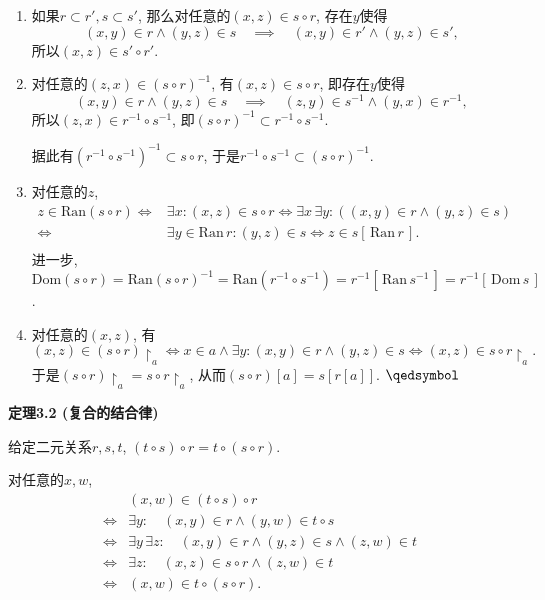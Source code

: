 \documentclass[UTF8]{ctexart}
\begin{document}
\begin{enumerate}
    \item 如果$r\subset r',s\subset s'$, 那么对任意的$(x,z)\in s\circ r$,
    存在$y$使得
    \[
        (x,y)\in r\land(y,z)\in s\quad\implies\quad
        (x,y)\in r'\land(y,z)\in s',
    \]
    所以$(x,z)\in s'\circ r'$.

    \item 对任意的$(z,x)\in(s\circ r)^{-1}$, 有$(x,z)\in s\circ r$,
    即存在$y$使得
    \[
        (x,y)\in r\land(y,z)\in s\quad\implies\quad
        (z,y)\in s^{-1}\land(y,x)\in r^{-1},
    \]
    所以$(z,x)\in r^{-1}\circ s^{-1}$,
    即$(s\circ r)^{-1}\subset r^{-1}\circ s^{-1}$.

    \hspace{2.17em}
    据此有$(r^{-1}\circ s^{-1})^{-1}\subset s\circ r$,
    于是$r^{-1}\circ s^{-1}\subset(s\circ r)^{-1}$.

    \item 对任意的$z$,
    \[\begin{aligned}
        z\in\mathrm{Ran}(s\circ r)\iff&\exists x:(x,z)\in s\circ r\iff
        \exists x\,\exists y:((x,y)\in r\land(y,z)\in s)\\[-3pt]
        \iff&\exists y\in\mathrm{Ran}\,r:(y,z)\in s\iff
        z\in s[\,\mathrm{Ran}\,r\,].\\[1pt]
    \end{aligned}\]
    进一步, $\mathrm{Dom}(s\circ r)=\mathrm{Ran}(s\circ r)^{-1}=
    \mathrm{Ran}(r^{-1}\circ s^{-1})=r^{-1}[\,\mathrm{Ran}\,s^{-1}\,]=
    r^{-1}[\,\mathrm{Dom}\,s\,]$.

    \item 对任意的$(x,z)$, 有
    \[
        (x,z)\in(s\circ r)\!\restriction_a\iff
        x\in a\land\exists y:(x,y)\in r\land(y,z)\in s\iff
        (x,z)\in s\circ r\!\restriction_a.
    \]
    于是$(s\circ r)\!\restriction_a=s\circ r\!\restriction_a$,
    从而$(s\circ r)[a]=s[r[a]]$. \hfill $\qedsymbol$
\end{enumerate}

\vspace{10pt}

\hypertarget{sec:定理3.2}{}
\noindent\textbf{定理3.2 (复合的结合律)}

给定二元关系$r,s,t$, $(t\circ s)\circ r=t\circ(s\circ r)$.


对任意的$x,w$,
\begin{equation*}\begin{aligned}
    &(x,w)\in(t\circ s)\circ r\\
    \iff&\exists y:\quad(x,y)\in r\land(y,w)\in t\circ s\\
    \iff&\exists y\,\exists z:\quad(x,y)\in r\land(y,z)\in s\land(z,w)\in t\\
    \iff&\exists z:\quad(x,z)\in s\circ r\land(z,w)\in t\\
    \iff&(x,w)\in t\circ(s\circ r).
\end{aligned}\tag*{\qedsymbol}\end{equation*}
\end{document}
